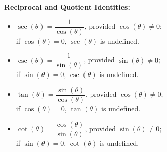 \documentclass{ximera}
\begin{document}
\begin{callout}
\textbf{Reciprocal and Quotient Identities:}   

\begin{itemize}

\item $\sec(\theta) = \dfrac{1}{\cos(\theta)}$, provided $\cos(\theta) \neq 0$;\\  if $\cos(\theta) = 0$, $\sec(\theta)$ is undefined.

\item $\csc(\theta) = \dfrac{1}{\sin(\theta)}$, provided $\sin(\theta) \neq 0$;\\  if $\sin(\theta) = 0$, $\csc(\theta)$ is undefined.

\item $\tan(\theta) = \dfrac{\sin(\theta)}{\cos(\theta)}$, provided $\cos(\theta) \neq 0$;\\  if $\cos(\theta) = 0$, $\tan(\theta)$ is undefined.

\item $\cot(\theta) = \dfrac{\cos(\theta)}{\sin(\theta)}$, provided $\sin(\theta) \neq 0$;\\  if $\sin(\theta) = 0$, $\cot(\theta)$ is undefined.

\end{itemize}
\end{callout}
\end{document}
